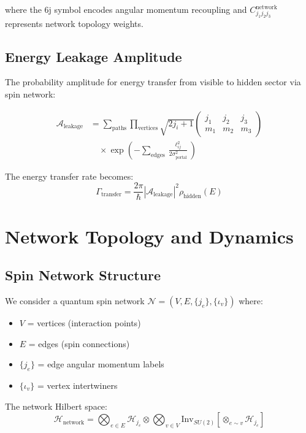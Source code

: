 \documentclass{article}
\begin{document}
where the 6j symbol encodes angular momentum recoupling and $C_{j_1j_2j_3}^{\text{network}}$ represents network topology weights.

\subsection{Energy Leakage Amplitude}

The probability amplitude for energy transfer from visible to hidden sector via spin network:

\begin{align}
\mathcal{A}_{\text{leakage}} &= \sum_{\text{paths}} \prod_{\text{vertices}} \sqrt{2j_i + 1} \begin{pmatrix} j_1 & j_2 & j_3 \\ m_1 & m_2 & m_3 \end{pmatrix} \\
&\quad \times \exp\left(-\sum_{\text{edges}} \frac{\ell_{ij}^2}{2\sigma_{\text{portal}}^2}\right)
\end{align}

The energy transfer rate becomes:
\begin{equation}
\Gamma_{\text{transfer}} = \frac{2\pi}{\hbar} |\mathcal{A}_{\text{leakage}}|^2 \rho_{\text{hidden}}(E)
\end{equation}

\section{Network Topology and Dynamics}

\subsection{Spin Network Structure}

We consider a quantum spin network $\mathcal{N} = (V, E, \{j_e\}, \{\iota_v\})$ where:
\begin{itemize}
\item $V$ = vertices (interaction points)
\item $E$ = edges (spin connections) 
\item $\{j_e\}$ = edge angular momentum labels
\item $\{\iota_v\}$ = vertex intertwiners
\end{itemize}

The network Hilbert space:
\begin{equation}
\mathcal{H}_{\text{network}} = \bigotimes_{e \in E} \mathcal{H}_{j_e} \otimes \bigotimes_{v \in V} \text{Inv}_{SU(2)}[\otimes_{e \sim v} \mathcal{H}_{j_e}]
\end{equation}
\end{document}
